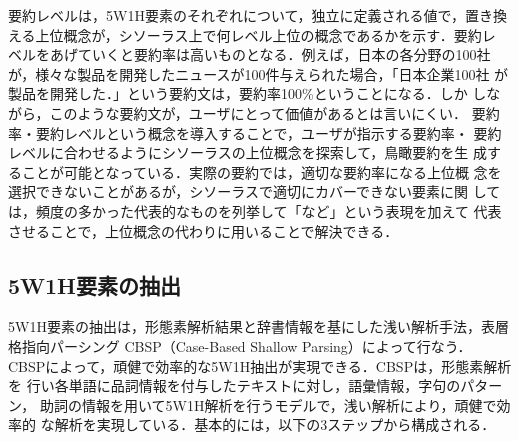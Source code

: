 要約レベルは，5W1H要素のそれぞれについて，独立に定義される値で，置き換
える上位概念が，シソーラス上で何レベル上位の概念であるかを示す．要約レ
ベルをあげていくと要約率は高いものとなる．例えば，日本の各分野の100社
が，様々な製品を開発したニュースが100件与えられた場合，「日本企業100社
が製品を開発した．」という要約文は，要約率100\%ということになる．しか
しながら，このような要約文が，ユーザにとって価値があるとは言いにくい．
要約率・要約レベルという概念を導入することで，ユーザが指示する要約率・
要約レベルに合わせるようにシソーラスの上位概念を探索して，鳥瞰要約を生
成することが可能となっている．実際の要約では，適切な要約率になる上位概
念を選択できないことがあるが，シソーラスで適切にカバーできない要素に関
しては，頻度の多かった代表的なものを列挙して「など」という表現を加えて
代表させることで，上位概念の代わりに用いることで解決できる．

\subsection{5W1H要素の抽出}
\label{sec:chushutsu}

5W1H要素の抽出は，形態素解析結果と辞書情報を基にした浅い解析手法，表層
格指向パーシング CBSP（Case-Based Shallow Parsing）によって行なう．
CBSPによって，頑健で効率的な5W1H抽出が実現できる．CBSPは，形態素解析を
行い各単語に品詞情報を付与したテキストに対し，語彙情報，字句のパターン，
助詞の情報を用いて5W1H解析を行うモデルで，浅い解析により，頑健で効率的
な解析を実現している．基本的には，以下の3ステップから構成される．

